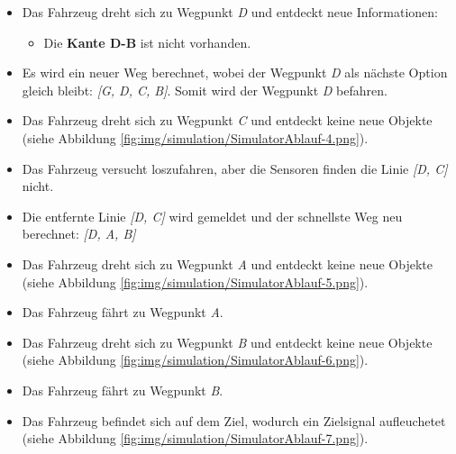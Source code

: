 \documentclass[../main.tex]{subfiles}
\begin{document}
\begin{itemize}
    \item Das Fahrzeug dreht sich zu Wegpunkt \textit{D} und entdeckt neue Informationen:
    \begin{itemize}
        \item Die \textbf{Kante D-B} ist nicht vorhanden.
    \end{itemize}
    \item Es wird ein neuer Weg berechnet, wobei der Wegpunkt \textit{D} als nächste Option gleich bleibt: \textit{[G, D, C, B]}. Somit wird der Wegpunkt \textit{D} befahren.
    \item Das Fahrzeug dreht sich zu Wegpunkt \textit{C} und entdeckt keine neue Objekte (siehe Abbildung \ref{fig:img/simulation/SimulatorAblauf-4.png}).
    \item Das Fahrzeug versucht loszufahren, aber die Sensoren finden die Linie \textit{[D, C]} nicht.
    \item Die entfernte Linie \textit{[D, C]} wird gemeldet und der schnellste Weg neu berechnet: \textit{[D, A, B]}
    \item Das Fahrzeug dreht sich zu Wegpunkt \textit{A} und entdeckt keine neue Objekte (siehe Abbildung \ref{fig:img/simulation/SimulatorAblauf-5.png}).
    \item Das Fahrzeug fährt zu Wegpunkt \textit{A}.
    \item Das Fahrzeug dreht sich zu Wegpunkt \textit{B} und entdeckt keine neue Objekte (siehe Abbildung \ref{fig:img/simulation/SimulatorAblauf-6.png}).
    \item Das Fahrzeug fährt zu Wegpunkt \textit{B}.
    \item Das Fahrzeug befindet sich auf dem Ziel, wodurch ein Zielsignal aufleuchetet (siehe Abbildung \ref{fig:img/simulation/SimulatorAblauf-7.png}).
\end{itemize}

\begin{minipage}{.5\textwidth}
  \centering
\end{minipage}%
\begin{minipage}{.5\textwidth}
  \centering
\end{minipage}
\begin{minipage}{.5\textwidth}
  \centering
\end{minipage}%
\begin{minipage}{.5\textwidth}
  \centering
\end{minipage}
\end{document}
